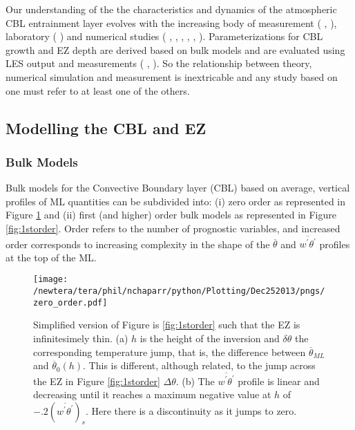 Our understanding of the the characteristics and dynamics of the atmospheric \acs{CBL} entrainment layer evolves with the increasing body of measurement (\citeauthor{Traum11} \citeyear{Traum11}, \citeauthor{StullNelEl} \citeyear{StullNelEl}), laboratory (\citeauthor{DearWill80} \citeyear{DearWill80}) and numerical studies (\citeauthor{Deardorff72} \citeyear{Deardorff72}, \citeauthor{Sorbjan} \citeyear{Sorbjan}, \citeauthor{SullMoengStev} \citeyear{SullMoengStev}, \citeauthor{FedConzMir04} \citeyear{FedConzMir04}, \citeauthor{BrooksFowler2} \citeyear{BrooksFowler2}, \citeauthor{GarciaMellado} \citeyear{GarciaMellado}). Parameterizations for \acs{CBL} growth and \acs{EZ} depth are derived based on bulk models and are evaluated using \acs{LES} output and measurements (\citeauthor{FedConzMir04} \citeyear{FedConzMir04}, \citeauthor{Boers89} \citeyear{Boers89}).  So the relationship between theory, numerical simulation and measurement is inextricable and any study based on one must refer to at least one of the others.\\  

\subsection{Modelling the CBL and EZ}
\label{subsec:}

\subsubsection{Bulk Models}
\label{subsubsec:}
Bulk  models for the Convective Boundary layer (\acs{CBL}) based on average, vertical profiles of \acs{ML} quantities can be subdivided into: (i) zero order as represented in Figure \ref{fig:0order} and (ii) first (and higher) order bulk models as represented in Figure \ref{fig:1storder}. Order refers to the number of prognostic variables, and increased order corresponds to increasing complexity in the shape of the  $\overline{\theta}$ and $\overline{w^{'}\theta^{'}}$ profiles at the top of the \acs{ML}.\\

\begin{figure}[htbp]
    \centering
    \texttt{[image: /newtera/tera/phil/nchaparr/python/Plotting/Dec252013/pngs/zero\_order.pdf]}
    \caption[Zero order \acs{CBL}]{Simplified version of Figure is \ref{fig:1storder} such that the \acs{EZ} is infinitesimely thin. (a) $h$ is the height of the  inversion and $\delta \theta$ the corresponding temperature jump, that is, the difference between $\overline{\theta}_{ML}$ and $\overline{\theta}_{0}(h)$. This is different, although related, to the jump across the \acs{EZ} in Figure \ref{fig:1storder} $\Delta \theta$. (b) The $\overline{w^{'}\theta^{'}}$ profile is linear and decreasing until it reaches a maximum negative value at $h$ of $-.2(\overline{w^{'}\theta^{'}})_{s}$. Here there is a discontinuity as it jumps to zero.}
    \label{fig:0order}   %
\end{figure}

